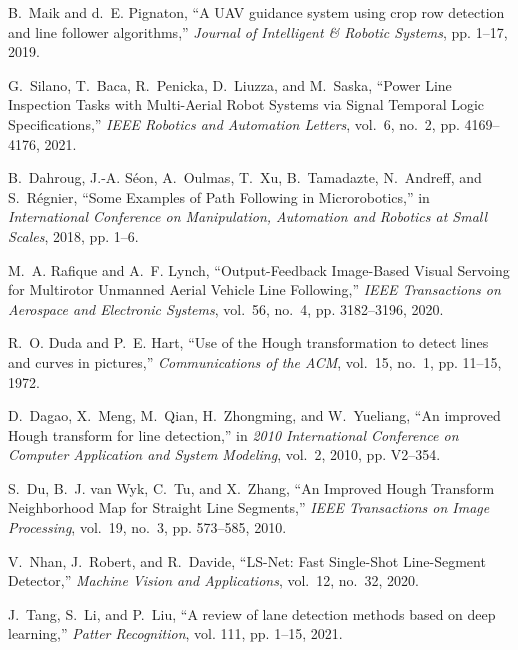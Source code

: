 \documentclass[a4paper,twocolumn,10pt]{article}
\begin{document}
    
    \footnotesize\begin{thebibliography}{10}
        B.~Maik and d.~E. Pignaton, ``{A UAV guidance system using crop row detection
        and line follower algorithms},'' \emph{Journal of Intelligent \& Robotic
        Systems}, pp. 1--17, 2019.

        G.~{Silano}, T.~{Baca}, R.~{Penicka}, D.~{Liuzza}, and M.~{Saska}, ``{Power
        Line Inspection Tasks with Multi-Aerial Robot Systems via Signal Temporal
        Logic Specifications},'' \emph{IEEE Robotics and Automation Letters}, vol.~6,
        no.~2, pp. 4169--4176, 2021.

        B.~Dahroug, J.-A. Séon, A.~Oulmas, T.~Xu, B.~Tamadazte, N.~Andreff, and
        S.~Régnier, ``{Some Examples of Path Following in Microrobotics},'' in
        \emph{International Conference on Manipulation, Automation and Robotics at
        Small Scales}, 2018, pp. 1--6.

        M.~A. Rafique and A.~F. Lynch, ``{Output-Feedback Image-Based Visual Servoing
        for Multirotor Unmanned Aerial Vehicle Line Following},'' \emph{IEEE
        Transactions on Aerospace and Electronic Systems}, vol.~56, no.~4, pp.
        3182--3196, 2020.

        R.~O. {Duda} and P.~E. {Hart}, ``{Use of the Hough transformation to detect
        lines and curves in pictures},'' \emph{Communications of the ACM}, vol.~15,
        no.~1, pp. 11--15, 1972.

        D.~Dagao, X.~Meng, M.~Qian, H.~Zhongming, and W.~Yueliang, ``{An improved Hough
        transform for line detection},'' in \emph{2010 International Conference on
        Computer Application and System Modeling}, vol.~2, 2010, pp. V2--354.

        S.~{Du}, B.~J. {van Wyk}, C.~{Tu}, and X.~{Zhang}, ``{An Improved Hough
        Transform Neighborhood Map for Straight Line Segments},'' \emph{IEEE
        Transactions on Image Processing}, vol.~19, no.~3, pp. 573--585, 2010.

        V.~Nhan, J.~Robert, and R.~Davide, ``{LS-Net: Fast Single-Shot Line-Segment
        Detector},'' \emph{Machine Vision and Applications}, vol.~12, no.~32, 2020.

        J.~{Tang}, S.~{Li}, and P.~{Liu}, ``{A review of lane detection methods based
        on deep learning},'' \emph{Patter Recognition}, vol. 111, pp. 1--15, 2021.


\end{thebibliography}
\end{document}
